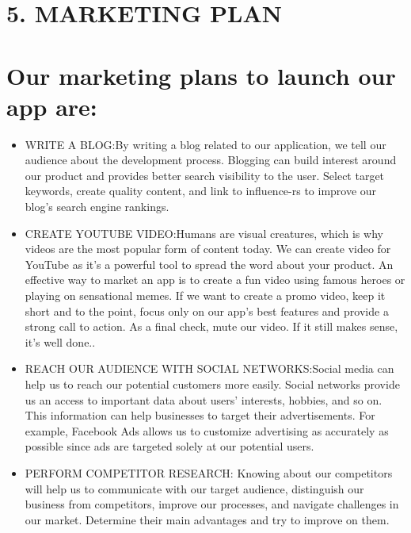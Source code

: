 \section *{\LARGE 5. MARKETING PLAN }
\section *{Our marketing plans to launch our app are: }
\begin{itemize}
    \item  WRITE A BLOG:By writing a blog related to our application, we tell our audience about the development process. Blogging can build interest around our product and provides better search visibility to the user. Select target keywords, create quality content, and link to influence-rs to improve our blog’s search engine rankings.
    \item CREATE YOUTUBE VIDEO:Humans are visual creatures, which is why videos are the most popular form of content today. We can create video for YouTube as it’s a powerful tool to spread the word about your product. An effective way to market an app is to create a fun video using famous heroes or playing on sensational memes.
    If we want to create a promo video, keep it short and to the point, focus only on our app’s best features and provide a strong call to action. As a final check, mute our video. If it still makes sense, it’s well done..
    \item REACH OUR AUDIENCE WITH SOCIAL NETWORKS:Social media can help us to reach our potential customers more easily. Social networks provide us an access to important data about users’ interests, hobbies, and so on. This information can help businesses to target their advertisements. For example, Facebook Ads allows us to customize advertising as accurately as possible since ads are targeted solely at our potential users.
    \item PERFORM COMPETITOR RESEARCH: Knowing about our competitors will help us to communicate with our target audience, distinguish our business from competitors, improve our processes, and navigate challenges in our market. Determine their main advantages and try to improve on them.
\end{itemize}
